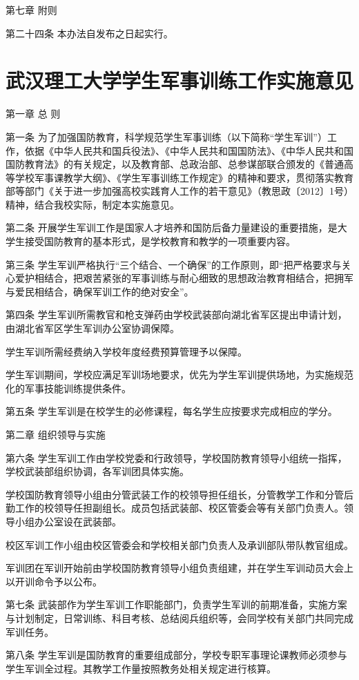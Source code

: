 \documentclass[UTF8,12pt,a4paper]{report}
\begin{document}
 

第七章  附则

第二十四条 本办法自发布之日起实行。
\chapter{武汉理工大学学生军事训练工作实施意见}
第一章 总 则

第一条 为了加强国防教育，科学规范学生军事训练（以下简称“学生军训”）工作，依据《中华人民共和国兵役法》、《中华人民共和国国防法》、《中华人民共和国国防教育法》的有关规定，以及教育部、总政治部、总参谋部联合颁发的《普通高等学校军事课教学大纲》、《学生军事训练工作规定》的精神和要求，贯彻落实教育部等部门《关于进一步加强高校实践育人工作的若干意见》（教思政〔2012〕1号）精神，结合我校实际，制定本实施意见。

第二条 开展学生军训工作是国家人才培养和国防后备力量建设的重要措施，是大学生接受国防教育的基本形式，是学校教育和教学的一项重要内容。

第三条 学生军训严格执行“三个结合、一个确保”的工作原则，即“把严格要求与关心爱护相结合，把艰苦紧张的军事训练与耐心细致的思想政治教育相结合，把拥军与爱民相结合，确保军训工作的绝对安全”。

第四条 学生军训所需教官和枪支弹药由学校武装部向湖北省军区提出申请计划，由湖北省军区学生军训办公室协调保障。

学生军训所需经费纳入学校年度经费预算管理予以保障。

学生军训期间，学校应满足军训场地要求，优先为学生军训提供场地，为实施规范化的军事技能训练提供条件。

第五条 学生军训是在校学生的必修课程，每名学生应按要求完成相应的学分。

第二章 组织领导与实施

第六条 学生军训工作由学校党委和行政领导，学校国防教育领导小组统一指挥，学校武装部组织协调，各军训团具体实施。

学校国防教育领导小组由分管武装工作的校领导担任组长，分管教学工作和分管后勤工作的校领导任担副组长。成员包括武装部、校区管委会等有关部门负责人。领导小组办公室设在武装部。

校区军训工作小组由校区管委会和学校相关部门负责人及承训部队带队教官组成。

军训团在军训开始前由学校国防教育领导小组负责组建，并在学生军训动员大会上以开训命令予以公布。

第七条 武装部作为学生军训工作职能部门，负责学生军训的前期准备，实施方案与计划制定，日常训练、科目考核、总结阅兵组织等，会同学校有关部门共同完成军训任务。

第八条 学生军训是国防教育的重要组成部分，学校专职军事理论课教师必须参与学生军训全过程。其教学工作量按照教务处相关规定进行核算。
\end{document}
